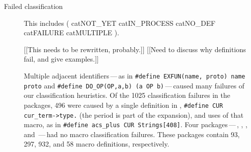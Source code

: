 \begin{description}
\item[Failed classification]

 This includes ( catNOT_YET catIN_PROCESS catNO_DEF catFAILURE
		       catMULTIPLE ).


  [[This needs to be rewritten, probably.]]
  [[Need to discuss why definitions fail, and give examples.]]

  Multiple adjacent identifiers\,---\,as in
  {\tt \#define EXFUN(name, proto) name proto} and {\tt \#define
  \verb|DO_OP|(OP,a,b) (a OP b)}\,---\,caused many failures of our
  classification heuristics.  Of the 1025 classification failures in the
  {\numpackages} packages, 496 were caused by a single definition in
  , {\tt \#define CUR \verb|cur_term->type.|} (the period is
  part of the expansion), and uses of that macro, as in {\tt \#define
  \verb|acs_plus| CUR Strings[408]}.  Four packages\,---\,,
  , , and \,---\,had no macro
  classification failures.  These packages contain 93, 297, 932, and 58 macro
  definitions, respectively.



\end{description}

